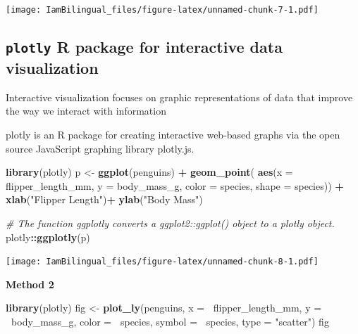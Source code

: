\documentclass[]{book}
\newenvironment{Shaded}{\begin{snugshade}}{\end{snugshade}}
\newcommand{\CommentTok}[1]{\textcolor[rgb]{0.56,0.35,0.01}{\textit{#1}}}
\newcommand{\DataTypeTok}[1]{\textcolor[rgb]{0.13,0.29,0.53}{#1}}
\newcommand{\KeywordTok}[1]{\textcolor[rgb]{0.13,0.29,0.53}{\textbf{#1}}}
\newcommand{\NormalTok}[1]{#1}
\newcommand{\OperatorTok}[1]{\textcolor[rgb]{0.81,0.36,0.00}{\textbf{#1}}}
\newcommand{\StringTok}[1]{\textcolor[rgb]{0.31,0.60,0.02}{#1}}
\begin{document}
\texttt{[image: IamBilingual\_files/figure-latex/unnamed-chunk-7-1.pdf]}

\hypertarget{plotly-r-package-for-interactive-data-visualization}{%
\subsection{\texorpdfstring{\texttt{plotly} R package for interactive data visualization}{plotly R package for interactive data visualization}}\label{plotly-r-package-for-interactive-data-visualization}}

Interactive visualization focuses on graphic representations of data that improve the way we interact with information

plotly is an R package for creating interactive web-based graphs via the open source JavaScript graphing library plotly.js.

\begin{Shaded}
\begin{Highlighting}[]
\KeywordTok{library}\NormalTok{(plotly)}
\NormalTok{p <-}\StringTok{ }\KeywordTok{ggplot}\NormalTok{(penguins) }\OperatorTok{+}
\StringTok{  }\KeywordTok{geom_point}\NormalTok{( }\KeywordTok{aes}\NormalTok{(}\DataTypeTok{x =}\NormalTok{ flipper_length_mm,}
                  \DataTypeTok{y =}\NormalTok{ body_mass_g,}
                  \DataTypeTok{color =}\NormalTok{ species,}
                  \DataTypeTok{shape =}\NormalTok{ species)) }\OperatorTok{+}
\StringTok{  }\KeywordTok{xlab}\NormalTok{(}\StringTok{"Flipper Length"}\NormalTok{)}\OperatorTok{+}
\StringTok{  }\KeywordTok{ylab}\NormalTok{(}\StringTok{"Body Mass"}\NormalTok{)}

\CommentTok{# The function ggplotly converts a ggplot2::ggplot() object to a plotly object.}
\NormalTok{plotly}\OperatorTok{::}\KeywordTok{ggplotly}\NormalTok{(p)}
\end{Highlighting}
\end{Shaded}

\texttt{[image: IamBilingual\_files/figure-latex/unnamed-chunk-8-1.pdf]}

\textbf{Method 2}

\begin{Shaded}
\begin{Highlighting}[]
\KeywordTok{library}\NormalTok{(plotly)}
\NormalTok{fig <-}\StringTok{ }\KeywordTok{plot_ly}\NormalTok{(penguins, }
               \DataTypeTok{x =} \OperatorTok{~}\NormalTok{flipper_length_mm,}
               \DataTypeTok{y =} \OperatorTok{~}\NormalTok{body_mass_g, }
               \DataTypeTok{color =} \OperatorTok{~}\NormalTok{species,}
               \DataTypeTok{symbol =} \OperatorTok{~}\NormalTok{species,}
               \DataTypeTok{type =} \StringTok{"scatter"}\NormalTok{)}
\NormalTok{fig}
\end{Highlighting}
\end{Shaded}
\end{document}
